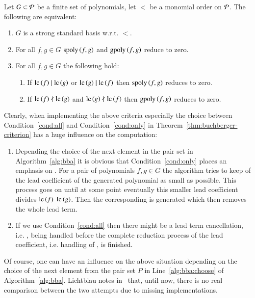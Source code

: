 \begin{theorem}
Let $G \subset \mathcal{P}$ be a finite set of polynomials, let $<$ be a monomial order
on $\mathcal{P}$. The following are equivalent:
\begin{enumerate}
\item $G$ is a strong standard basis w.r.t. $<$.
\item\label{cond:all} For all $f,g \in G$ $\mathrm{spoly}\left({f},{g}\right)$ and $\mathrm{gpoly}\left({f},{g}\right)$ reduce to zero.
\item\label{cond:only} For all $f,g \in G$ the following hold:
\begin{enumerate}
\item If $\mathrm{lc}\left({f}\right) \mid \mathrm{lc}\left({g}\right)$ or $\mathrm{lc}\left({g}\right) \mid \mathrm{lc}\left({f}\right)$ then $\mathrm{spoly}\left({f},{g}\right)$ reduces to zero.
\item If $\mathrm{lc}\left({f}\right) \nmid \mathrm{lc}\left({g}\right)$ and $\mathrm{lc}\left({g}\right) \nmid \mathrm{lc}\left({f}\right)$ then $\mathrm{gpoly}\left({f},{g}\right)$ reduces to zero.
\end{enumerate}
\end{enumerate}
\label{thm:buchberger-criterion}
\end{theorem}

Clearly, when implementing the above criteria especially the choice between
Condition~\ref{cond:all} and Condition~\ref{cond:only} in
Theorem~\ref{thm:buchberger-criterion} has a huge influence on the computation:
\begin{enumerate}
\item Depending the choice of the next element in the pair set in
Algorithm~\ref{alg:bba} it is obvious that Condition~\ref{cond:only} places an
emphasis on \gpts. For a pair of polynomials $f,g\in G$ the algorithm tries to
keep of the lead coefficient of the generated polynomial as small as possible.
This process goes on until at some point eventually this smaller lead
coefficient divides $\mathrm{lc}\left({f}\right)$ $\mathrm{lc}\left({g}\right)$. Then the corresponding \spt is generated
which then removes the whole lead term.
\item If we use Condition~\ref{cond:all} then there might be a lead term
cancellation, i.e. \spt, being handled before the complete reduction process of
the lead coefficient, i.e. handling of \gpts, is finished.
\end{enumerate}

Of course, one can have an influence on the above situation depending on the
choice of the next element from the pair set $P$ in Line~\ref{alg:bba:choose} of
Algorithm~\ref{alg:bba}. Lichtblau notes in~\cite{lichtblau2012} that, until
now,
there is no real comparison between the two attempts due to missing
implementations.


